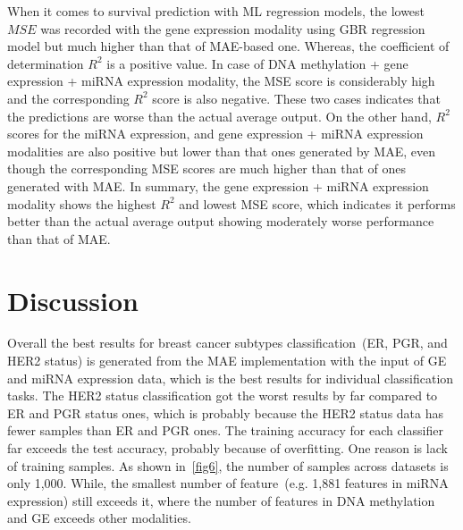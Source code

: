 \hspace*{3.5mm} When it comes to survival prediction with ML regression models, the lowest $MSE$ was recorded with the gene expression modality using GBR regression model but much higher than that of MAE-based one. Whereas, the coefficient of determination $R^2$ is a positive value. In case of DNA methylation + gene expression + miRNA expression modality, the MSE score is considerably high and the corresponding $R^2$ score is also negative. These two cases indicates that the predictions are worse than the actual average output. On the other hand, $R^2$ scores for the miRNA expression, and gene expression + miRNA expression modalities are also positive but lower than that ones generated by MAE, even though the corresponding MSE scores are much higher than that of ones generated with MAE. In summary, the gene expression + miRNA expression modality shows the highest $R^2$  and lowest MSE score, which indicates it performs better than the actual average output showing moderately worse performance than that of MAE. 
\fi 

\section{Discussion}\label{chapter_4:discussion}
Overall the best results for breast cancer subtypes classification~(ER, PGR, and HER2 status) is generated from the MAE implementation with the input of GE and miRNA expression data, which is the best results for individual classification tasks. The HER2 status classification got the worst results by far compared to ER and PGR status ones, which is probably because the HER2 status data has fewer samples than ER and PGR ones. The training accuracy for each classifier far exceeds the test accuracy, probably because of overfitting. One reason is lack of training samples. As shown in~\cref{fig6}, the number of samples across datasets is only 1,000. While, the smallest number of feature~(e.g. 1,881 features in miRNA expression) still exceeds it, where the number of features in DNA methylation and GE exceeds other modalities. 


